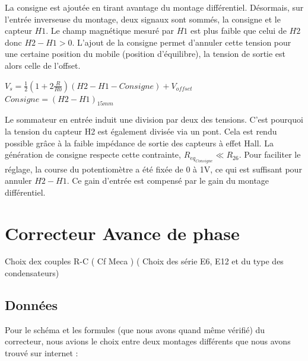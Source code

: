 \documentclass[11pt, french]{article} %
\begin{document}
La consigne est ajoutée en tirant avantage du montage différentiel. Désormais, sur l'entrée inverseuse du montage, deux signaux sont sommés, la consigne et le capteur $H1$. Le champ magnétique mesuré par $H1$ est plus faible que celui de $H2$ donc $H2-H1>0$. L'ajout de la consigne permet d'annuler cette tension pour une certaine position du mobile (position d'équilibre), la tension de sortie est alors celle de l'offset.
\begin{center}
$V_s=\frac{1}{2}(1+2 \frac{R}{R0})(H2-H1-Consigne) + V_{offset}$
$Consigne = (H2-H1)_{15mm}$
\end{center}
Le sommateur en entrée induit une division par deux des tensions. C'est pourquoi la tension du capteur H2 est également divisée via un pont. Cela est rendu possible grâce à la faible impédance de sortie des capteurs à effet Hall. La génération de consigne respecte cette contrainte, $R_{eq_{Consigne}} \ll R_{26}$. Pour faciliter le réglage, la course du potentiomètre a été fixée de 0 à 1V, ce qui est suffisant pour annuler $H2-H1$. Ce gain d'entrée est compensé par le gain du montage différentiel. 




\section{Correcteur Avance de phase}

Choix dex couples R-C ( Cf Meca ) ( Choix des série E6, E12 et du type des condensateurs)



\subsection{Données}

\noindent
Pour le schéma et les formules (que nous avons quand même vérifié) du correcteur, nous avions le choix entre deux montages différents que nous avons trouvé sur internet :
\end{document}
